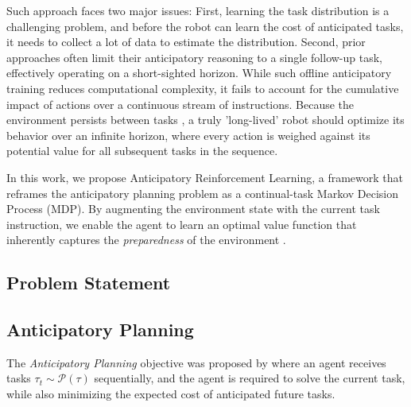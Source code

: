 \documentclass[10pt]{article} %
\begin{document}
Such approach faces two major issues: First, learning the task distribution is a challenging problem, and before the robot can learn the cost of anticipated tasks, it needs to collect a lot of data to estimate the distribution.
Second, prior approaches often limit their anticipatory reasoning to a single follow-up task, effectively operating on a short-sighted horizon. While such offline anticipatory training reduces computational complexity, it fails to account for the cumulative impact of actions over a continuous stream of instructions. Because the environment persists between tasks , a truly 'long-lived' robot should optimize its behavior over an infinite horizon, where every action is weighed against its potential value for all subsequent tasks in the sequence.


In this work, we propose Anticipatory Reinforcement Learning, a framework that reframes the anticipatory planning problem as a continual-task Markov Decision Process (MDP). By augmenting the environment state with the current task instruction, we enable the agent to learn an optimal value function that inherently captures the \textit{preparedness} of the environment .


\vspace{-2em}
\subsection{Problem Statement}

\subsection{Anticipatory Planning}
The \textit{Anticipatory Planning} objective was proposed by \cite{dhakal_anticipatory_2023} where an agent receives tasks $\tau_t \sim \mathcal{P}(\tau)$ sequentially, and the agent is required to solve the current task, while also minimizing the expected cost of anticipated future tasks. 
\end{document}
